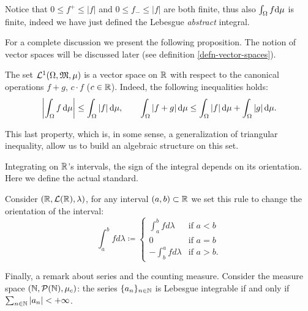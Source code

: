 Notice that $0\leq f^+ \leq |f|$ and $0\leq f_- \leq |f|$ are both finite, thus also $\int_\Omega f \mathrm d\mu$ is finite, indeed we have just defined the Lebesgue \textit{abstract} integral.

For a complete discussion we present the following proposition. The notion of vector spaces will be discussed later (see definition \vref{defn-vector-spaces}).
\begin{prop}\label{prop-triang-ineq-integral}
	The set $\mathcal L^1(\Omega,\mathfrak M,\mu)$ is a vector space on $\mathbb R$ with respect to the canonical operations $f+g$, $c \cdot f$ ($c \in \mathbb R$).
	Indeed, the following inequalities holds:
	$$
		\left| \int_\Omega f \,\mathrm d\mu \right| 
		\leq \int_{\Omega} |f| \,\mathrm d\mu,
		\qquad \int_\Omega |f+g| \, \mathrm d \mu 
		\leq \int_\Omega|f| \, \mathrm d \mu + \int_\Omega |g| \, \mathrm d \mu
	.
	$$
\end{prop}
This last property, which is, in some sense, a generalization of triangular inequality, allow us to build an algebraic structure on this set.

Integrating on $\mathbb R$'s intervals, the sign of the integral depends on its orientation. Here we define the actual standard.
\begin{defn}
	Consider $(\mathbb R, \mathcal L(\mathbb R), \lambda)$, for any interval $(a,b) \subset \mathbb R$ we set this rule to change the orientation of the interval:
	$$\int_{a}^{b} f d \lambda \coloneqq \begin{cases}
	\int_{a}^{b} f d\lambda & \text{if } a < b \\
	0 & \text{if } a=b \\
	- \int_{b}^{a} f d\lambda & \text{if } a > b.
	\end{cases}$$
\end{defn}

Finally, a remark about series and the counting measure. Consider the measure space $(\mathbb N, \mathcal P(\mathbb N), \mu_c)$: the series $\{a_n\}_{n\in \mathbb N}$ is Lebesgue integrable if and only if $\sum_{n \in \mathbb N}|a_n| < +\infty$.